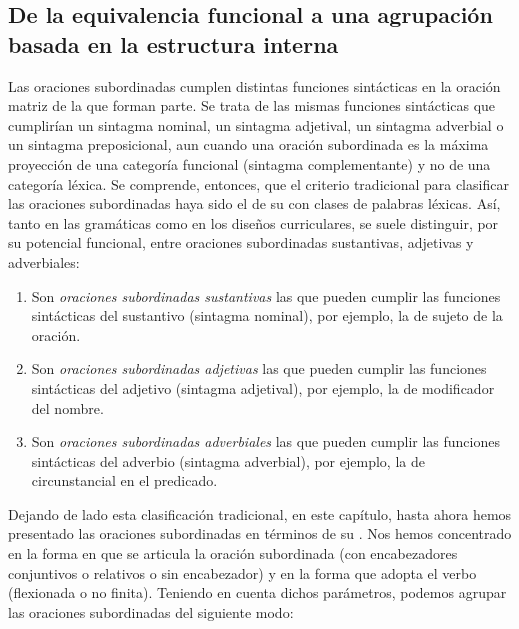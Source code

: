 \subsection{De la equivalencia funcional a una agrupación basada en la estructura interna}\label{sec:13-equivalencia}

Las oraciones subordinadas cumplen distintas funciones sintácticas en la oración
matriz de la que forman parte. Se trata de las mismas funciones sintácticas que
cumplirían un sintagma nominal, un sintagma adjetival, un sintagma adverbial o un
sintagma preposicional, aun cuando una oración subordinada es la máxima
proyección de una categoría funcional (sintagma complementante) y no de una
categoría léxica. Se comprende, entonces, que el criterio tradicional para
clasificar las oraciones subordinadas haya sido el de su  con clases de palabras léxicas. Así, tanto en las gramáticas como en
los diseños curriculares, se suele distinguir, por su potencial funcional, entre
oraciones subordinadas sustantivas, adjetivas y adverbiales:

\begin{enumerate}[label=(\alph*)]
  \item Son \textit{oraciones subordinadas sustantivas} las que pueden cumplir
        las funciones sintácticas del sustantivo (sintagma nominal), por
        ejemplo, la de sujeto de la oración.
  \item Son \textit{oraciones subordinadas adjetivas} las que pueden cumplir las
        funciones sintácticas del adjetivo (sintagma adjetival), por ejemplo, la
        de modificador del nombre.
  \item Son \textit{oraciones subordinadas adverbiales} las que pueden cumplir
        las funciones sintácticas del adverbio (sintagma adverbial), por
        ejemplo, la de circunstancial en el predicado.
\end{enumerate}

Dejando de lado esta clasificación tradicional, en este capítulo, hasta ahora
hemos presentado las oraciones subordinadas en términos de su . Nos hemos concentrado en la forma en que se articula la oración
subordinada (con encabezadores conjuntivos o relativos o sin encabezador) y en la
forma que adopta el verbo (flexionada o no finita). Teniendo en cuenta dichos
parámetros, podemos agrupar las oraciones subordinadas del siguiente modo:

